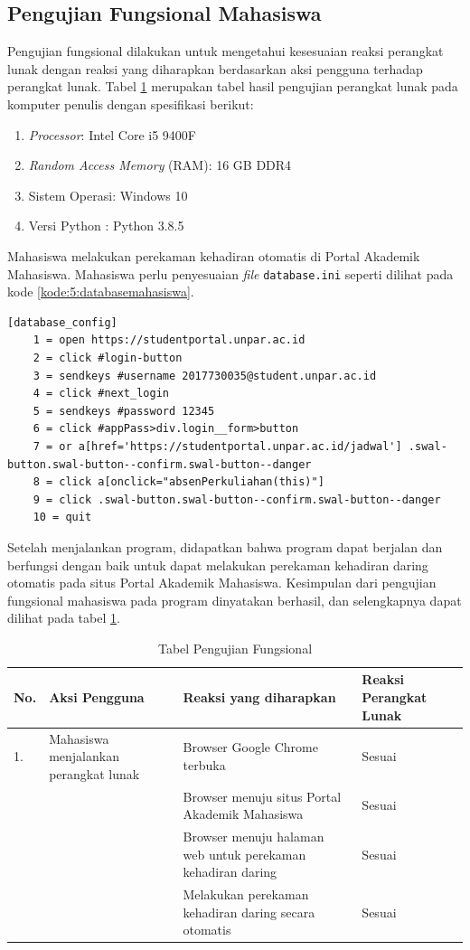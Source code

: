 \subsection{Pengujian Fungsional Mahasiswa}
Pengujian fungsional dilakukan untuk mengetahui kesesuaian reaksi perangkat lunak dengan reaksi yang diharapkan berdasarkan aksi pengguna terhadap perangkat lunak. Tabel \ref{tab:fungsiMahasiswa} merupakan tabel hasil pengujian perangkat lunak pada komputer penulis dengan spesifikasi berikut:
\begin{enumerate}
	\item \textit{Processor}: Intel Core i5 9400F
	\item \textit{Random Access Memory} (RAM): 16 GB DDR4
	\item Sistem Operasi: Windows 10
	\item Versi Python : Python 3.8.5
\end{enumerate}

Mahasiswa melakukan perekaman kehadiran otomatis di Portal Akademik Mahasiswa. Mahasiswa perlu penyesuaian \textit{file} \texttt{database.ini} seperti dilihat pada kode \ref{kode:5:databasemahasiswa}.
\\
\begin{lstlisting}[caption=\textit{File} \texttt{database.ini} Portal Akademik Mahasiswa (\textit{password} disembunyikan), label=kode:5:databasemahasiswa]
	[database_config]
	1 = open https://studentportal.unpar.ac.id
	2 = click #login-button
	3 = sendkeys #username 2017730035@student.unpar.ac.id 
	4 = click #next_login
	5 = sendkeys #password 12345
	6 = click #appPass>div.login__form>button
	7 = or a[href='https://studentportal.unpar.ac.id/jadwal'] .swal-button.swal-button--confirm.swal-button--danger
	8 = click a[onclick="absenPerkuliahan(this)"]
	9 = click .swal-button.swal-button--confirm.swal-button--danger
	10 = quit
\end{lstlisting}


Setelah menjalankan program, didapatkan bahwa program dapat berjalan dan berfungsi dengan baik untuk dapat melakukan perekaman kehadiran daring otomatis pada situs Portal Akademik Mahasiswa. Kesimpulan dari pengujian fungsional mahasiswa pada program dinyatakan berhasil, dan selengkapnya dapat dilihat pada tabel \ref{tab:fungsiMahasiswa}.

\begin{table}[H]			
	\caption{Tabel Pengujian Fungsional}
	\centering
	\begin{tabular}{|p{0.5cm} |p{4cm} |p{5.5cm}| p{3cm}|} \hline
		No. & Aksi Pengguna & Reaksi yang diharapkan & Reaksi Perangkat Lunak\\ \hline     
		1. 	& Mahasiswa menjalankan perangkat lunak & Browser Google Chrome terbuka & Sesuai\\ \hline 
	 		& &  Browser menuju situs Portal Akademik Mahasiswa & Sesuai\\ \hline 
			& &  Browser menuju halaman web untuk perekaman kehadiran daring & Sesuai\\ \hline 
			& &  Melakukan perekaman kehadiran daring secara otomatis & Sesuai\\ \hline
	\end{tabular}
	\label{tab:fungsiMahasiswa}
\end{table}

